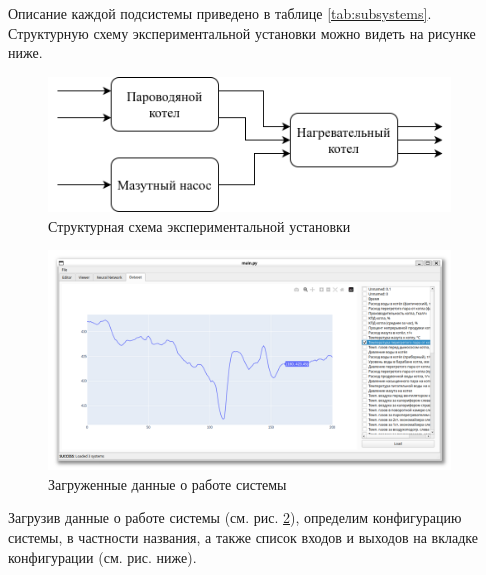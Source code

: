 Описание каждой подсистемы приведено в таблице \ref{tab:subsystems}. Структурную
схему экспериментальной установки можно видеть на рисунке ниже. 

\begin{figure}[H]
  \begin{center}
    \includegraphics[width=0.95\textwidth]{figures/subsystem_diagram.png}
  \end{center}
  \caption{Структурная схема экспериментальной
  установки}\label{fig:subsystem_diagram}
\end{figure}

\begin{figure}[H]
  \begin{center}
    \includegraphics[width=0.95\textwidth]{figures/modules/loader.png}
  \end{center}
  \caption{Загруженные данные о работе системы}\label{fig:test:loaded_data}
\end{figure}

Загрузив данные о работе системы (см. рис. \ref{fig:test:loaded_data}),
определим конфигурацию системы, в частности названия, а также список входов и
выходов на вкладке конфигурации (см. рис. ниже).

